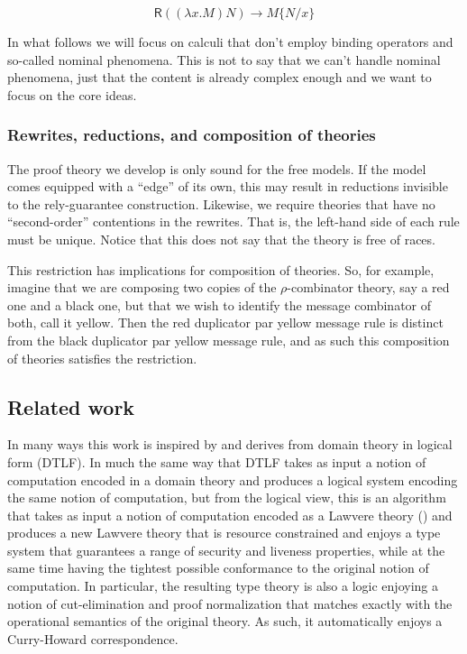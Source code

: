 \documentclass{llncs}
\renewcommand{\:}{\colon}
\begin{document}
\begin{equation*}
  \mathsf{R}((\lambda x.M)N) \rightarrow M\{ N/x \}
\end{equation*}    

In what follows we will focus on calculi that don't employ binding
operators and so-called nominal phenomena. This is not to say that we
can't handle nominal phenomena, just that the content is already
complex enough and we want to focus on the core ideas.

\subsubsection{Rewrites, reductions, and composition of theories}
The proof theory we develop is only sound for the free models. If the
model comes equipped with a ``edge'' of its own, this may result in
reductions invisible to the rely-guarantee construction. Likewise, we
require theories that have no ``second-order'' contentions in the
rewrites. That is, the left-hand side of each rule must be
unique. Notice that this does not say that the theory is free of
races.

This restriction has implications for composition of theories. So, for
example, imagine that we are composing two copies of the
$\rho$-combinator theory, say a red one and a black one, but that we
wish to identify the message combinator of both, call it yellow. Then
the red duplicator par yellow message rule is distinct from the black
duplicator par yellow message rule, and as such this composition of
theories satisfies the restriction.


\subsection{Related work}
In many ways this work is inspired by and derives from domain theory
in logical form (DTLF).\cite{DBLP:journals/apal/Abramsky91} In much
the same way that DTLF takes as input a notion of computation encoded
in a domain theory and produces a logical system encoding the same
notion of computation, but from the logical view, this is an algorithm
that takes as input a notion of computation encoded as a Lawvere
theory (\cite{DBLP:journals/entcs/HylandP07}) and produces a new
Lawvere theory that is resource constrained and enjoys a type system
that guarantees a range of security and liveness properties, while at
the same time having the tightest possible conformance to the original
notion of computation. In particular, the resulting type theory is
also a logic enjoying a notion of cut-elimination and proof
normalization that matches exactly with the operational semantics of
the original theory. As such, it automatically enjoys a Curry-Howard
correspondence.
\end{document}
